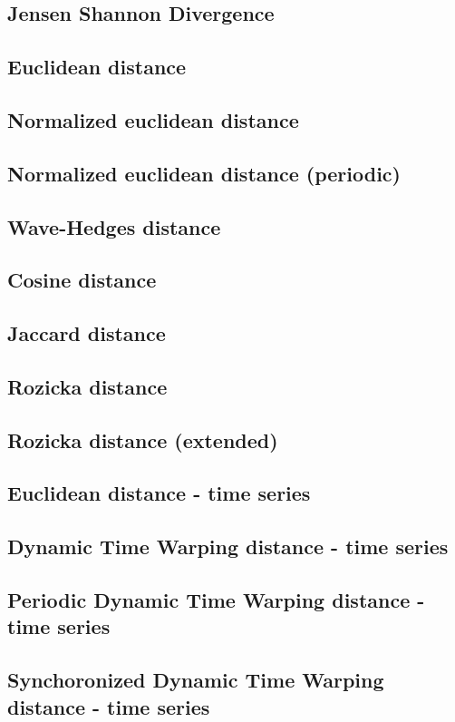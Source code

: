 \label{measures}

\subsection{Jensen Shannon Divergence}

\subsection{Euclidean distance}

\subsection{Normalized euclidean distance}

\subsection{Normalized euclidean distance (periodic)}

\subsection{Wave-Hedges distance}

\subsection{Cosine distance}

\subsection{Jaccard distance}

\subsection{Rozicka distance}

\subsection{Rozicka distance (extended)}

\subsection{Euclidean distance - time series}

\subsection{Dynamic Time Warping distance - time series}

\subsection{Periodic Dynamic Time Warping distance - time series}

\subsection{Synchoronized Dynamic Time Warping distance - time series}